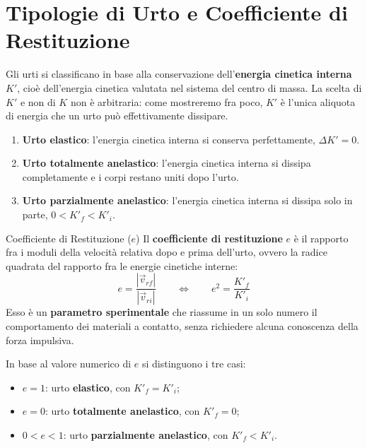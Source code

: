 \section{Tipologie di Urto e Coefficiente di Restituzione}

Gli urti si classificano in base alla conservazione dell'\textbf{energia cinetica interna} $K'$, cioè dell'energia cinetica valutata nel sistema del centro di massa. La scelta di $K'$ e non di $K$ non è arbitraria: come mostreremo fra poco, $K'$ è l'unica aliquota di energia che un urto può effettivamente dissipare.

\begin{enumerate}
    \item \textbf{Urto elastico}: l'energia cinetica interna si conserva perfettamente, $\Delta K' = 0$.
    \item \textbf{Urto totalmente anelastico}: l'energia cinetica interna si dissipa completamente e i corpi restano uniti dopo l'urto.
    \item \textbf{Urto parzialmente anelastico}: l'energia cinetica interna si dissipa solo in parte, $0 < K'_f < K'_i$.
\end{enumerate}

\begin{definizione}{Coefficiente di Restituzione ($e$)}
Il \textbf{coefficiente di restituzione} $e$ è il rapporto fra i moduli della velocità relativa dopo e prima dell'urto, ovvero la radice quadrata del rapporto fra le energie cinetiche interne:
\begin{equation}
    e = \frac{|\vec{v}_{rf}|}{|\vec{v}_{ri}|}
    \qquad \Longleftrightarrow \qquad
    e^2 = \frac{K'_{f}}{K'_{i}}
\end{equation}
Esso è un \textbf{parametro sperimentale} che riassume in un solo numero il comportamento dei materiali a contatto, senza richiedere alcuna conoscenza della forza impulsiva.
\end{definizione}

In base al valore numerico di $e$ si distinguono i tre casi:
\begin{itemize}
    \item $e = 1$: urto \textbf{elastico}, con $K'_{f} = K'_{i}$;
    \item $e = 0$: urto \textbf{totalmente anelastico}, con $K'_{f} = 0$;
    \item $0 < e < 1$: urto \textbf{parzialmente anelastico}, con $K'_{f} < K'_{i}$.
\end{itemize}


